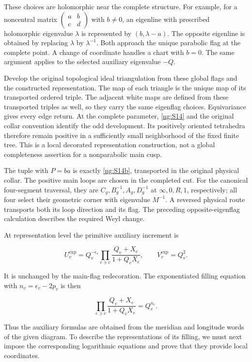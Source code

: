 These choices are holomorphic near the complete structure.
For example, for a noncentral matrix
\(\left(\begin{smallmatrix}a&b\\c&d\end{smallmatrix}\right)\)
with \(b\ne0\), an eigenline with prescribed holomorphic
eigenvalue \(\lambda\) is represented by
\((b,\lambda-a)\). The opposite eigenline is obtained by
replacing \(\lambda\) by \(\lambda^{-1}\).
Both approach the unique parabolic flag at the complete point.
A change of coordinate handles a chart with \(b=0\).
The same argument applies to the selected auxiliary eigenvalue
\(-Q\).

Develop the original topological ideal triangulation from these
global flags and the constructed representation. The map of
each triangle is the unique map of its transported ordered
triple. The adjacent white maps are defined from these transported
triples as well, so they carry the same eigenflag choices.
Equivariance gives every edge return. At the complete parameter,
\eqref{ng:S14} and the original collar convention identify the odd
development. Its positively oriented tetrahedra therefore remain
positive in a sufficiently small neighborhood of the fixed
finite tree. This is a local decorated representation
construction, not a global completeness assertion for a
nonparabolic main cusp.

The tuple with \(P=ba\) is exactly \eqref{ng:S14b}, transported in the
original physical collar. The positive main loops are chosen
in the completed cut. For the canonical four-segment traversal,
they are \(C_g,B_g^{-1},A_g,D_g^{-1}\) at
\(\infty,0,R,1\), respectively; all four select their geometric
corner with eigenvalue \(M^{-1}\). A reversed physical route
transports both its loop direction and its flag. The preceding
opposite-eigenflag calculation describes the required Weyl change.

At representation level the primitive auxiliary increment is

\begin{equation}\label{ng:S16}
U_v^{\exp}
       =Q_v^{-\epsilon_v}
          \prod_{e\ni v}\frac{Q_v+X_e}{1+Q_vX_e},\qquad
 V_v^{\exp}=Q_v^2.
\end{equation}

It is unchanged by the main-flag redecoration. The exponentiated filling
equation with \(n_v=\epsilon_v-2p_v\) is then

\begin{equation}\label{ng:S17}
\prod_{e\ni v}\frac{Q_v+X_e}{1+Q_vX_e}
                                =Q_v^{n_v}.
\end{equation}

Thus the auxiliary formulas are obtained from the meridian and
longitude words of the given diagram. To describe the representations
of its filling, we must next impose the corresponding logarithmic
equations and prove that they provide local coordinates.
